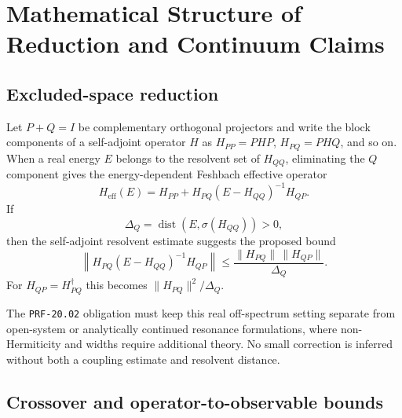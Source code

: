 \chapter{Mathematical Structure of Reduction and Continuum Claims}

\label{ch:mathematics-of-reduction}



\section{Excluded-space reduction}


Let $P+Q=I$ be complementary orthogonal projectors and write the block
components of a self-adjoint operator $H$ as $H_{PP}=PHP$,
$H_{PQ}=PHQ$, and so on. When a real energy $E$ belongs to the resolvent set of
$H_{QQ}$, eliminating the $Q$ component gives the energy-dependent Feshbach
effective operator~\cite{feshbach1958,feshbach1962}
\begin{equation}
  H_{\mathrm{eff}}(E)
  =
  H_{PP}+H_{PQ}(E-H_{QQ})^{-1}H_{QP}.
\end{equation}
If
\begin{equation}
  \Delta_Q=\operatorname{dist}(E,\sigma(H_{QQ}))>0,
\end{equation}
then the self-adjoint resolvent estimate suggests the proposed bound
\begin{equation}
  \left\|
    H_{PQ}(E-H_{QQ})^{-1}H_{QP}
  \right\|
  \leq
  \frac{\|H_{PQ}\|\,\|H_{QP}\|}{\Delta_Q}.
\end{equation}
For $H_{QP}=H_{PQ}^{\dagger}$ this becomes
$\|H_{PQ}\|^2/\Delta_Q$.

The \texttt{PRF-20.02} obligation must keep this real off-spectrum setting
separate from open-system or analytically continued resonance formulations,
where non-Hermiticity and widths require additional theory. No small correction
is inferred without both a coupling estimate and resolvent distance.

\section{Crossover and operator-to-observable bounds}


